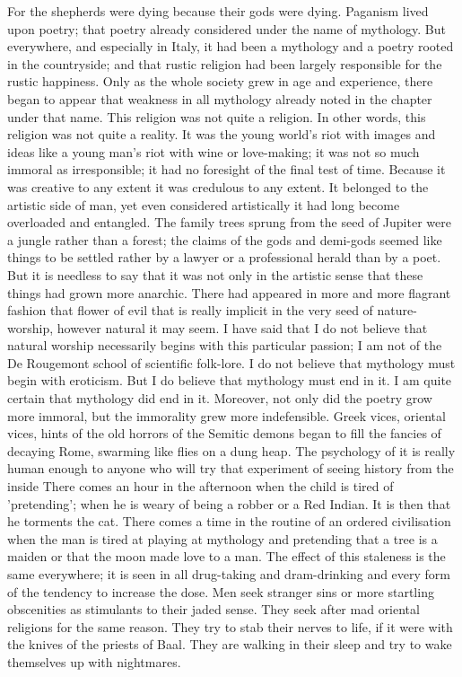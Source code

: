 For the shepherds were dying because their gods were dying. Paganism lived upon poetry; that poetry already considered under the name of mythology. But everywhere, and especially in Italy, it had been a mythology and a poetry rooted in the countryside; and that rustic religion had been largely responsible for the rustic happiness. Only as the whole society grew in age and experience, there began to appear that weakness in all mythology already noted in the chapter under that name. This religion was not quite a religion. In other words, this religion was not quite a reality. It was the young world's riot with images and ideas like a young man's riot with wine or love-making; it was not so much immoral as irresponsible; it had no foresight of the final test of time. Because it was creative to any extent it was credulous to any extent. It belonged to the artistic side of man, yet even considered artistically it had long become overloaded and entangled. The family trees sprung from the seed of Jupiter were a jungle rather than a forest; the claims of the gods and demi-gods seemed like things to be settled rather by a lawyer or a professional herald than by a poet. But it is needless to say that it was not only in the artistic sense that these things had grown more anarchic. There had appeared in more and more flagrant fashion that flower of evil that is really implicit in the very seed of nature-worship, however natural it may seem. I have said that I do not believe that natural worship necessarily begins with this particular passion; I am not of the De Rougemont school of scientific folk-lore. I do not believe that mythology must begin with eroticism. But I do believe that mythology must end in it. I am quite certain that mythology did end in it. Moreover, not only did the poetry grow more immoral, but the immorality grew more indefensible. Greek vices, oriental vices, hints of the old horrors of the Semitic demons began to fill the fancies of decaying Rome, swarming like flies on a dung heap. The psychology of it is really human enough to anyone who will try that experiment of seeing history from the inside There comes an hour in the afternoon when the child is tired of 'pretending'; when he is weary of being a robber or a Red Indian. It is then that he torments the cat. There comes a time in the routine of an ordered civilisation when the man is tired at playing at mythology and pretending that a tree is a maiden or that the moon made love to a man. The effect of this staleness is the same everywhere; it is seen in all drug-taking and dram-drinking and every form of the tendency to increase the dose. Men seek stranger sins or more startling obscenities as stimulants to their jaded sense. They seek after mad oriental religions for the same reason. They try to stab their nerves to life, if it were with the knives of the priests of Baal. They are walking in their sleep and try to wake themselves up with nightmares.

